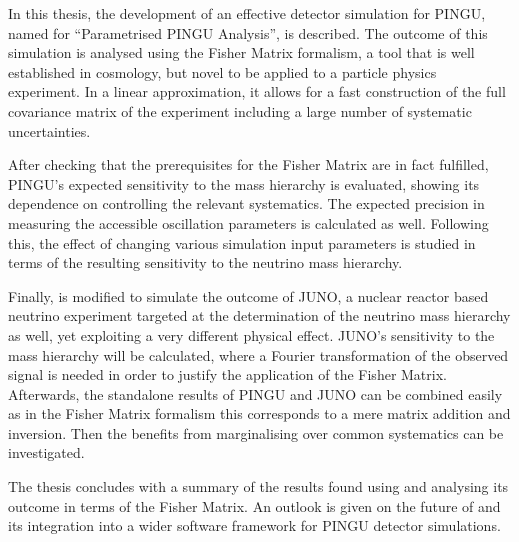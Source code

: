 In this thesis, the development of an effective detector simulation for PINGU,
named \papa for ``Parametrised PINGU Analysis'', is described. The outcome of
this simulation is analysed using the Fisher Matrix formalism, a tool that is
well established in cosmology, but novel to be applied to a particle physics
experiment. In a linear approximation, it allows for a fast construction of the
full covariance matrix of the experiment including a large number of systematic
uncertainties.

After checking that the prerequisites for the Fisher Matrix are in fact
fulfilled, PINGU's expected sensitivity to the mass hierarchy is evaluated,
showing its dependence on controlling the relevant systematics. The expected
precision in measuring the accessible oscillation parameters is calculated as
well. Following this, the effect of changing various simulation input
parameters is studied in terms of the resulting sensitivity to the neutrino
mass hierarchy.

Finally, \papa is modified to simulate the outcome of JUNO, a nuclear reactor
based neutrino experiment targeted at the determination of the neutrino mass
hierarchy as well, yet exploiting a very different physical effect. JUNO's
sensitivity to the mass hierarchy will be calculated, where a Fourier
transformation of the observed signal is needed in order to justify the
application of the Fisher Matrix. Afterwards, the standalone results of PINGU
and JUNO can be combined easily as in the Fisher Matrix formalism this
corresponds to a mere matrix addition and inversion. Then the benefits from
marginalising over common systematics can be investigated.

The thesis concludes with a summary of the results found using \papa and
analysing its outcome in terms of the Fisher Matrix. An outlook is given on the
future of \papa and its integration into a wider software framework for PINGU
detector simulations.
